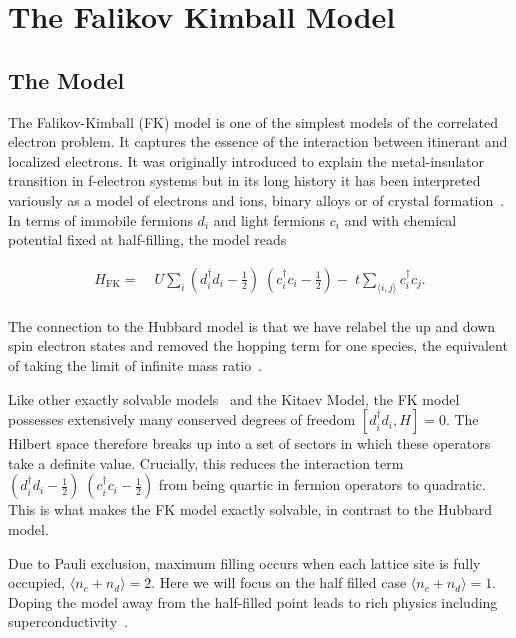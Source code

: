 \hypertarget{the-falikov-kimball-model}{%
\section{The Falikov Kimball Model}\label{the-falikov-kimball-model}}

\hypertarget{the-model}{%
\subsection{The Model}\label{the-model}}

The Falikov-Kimball (FK) model is one of the simplest models of the correlated electron problem. It captures the essence of the interaction between itinerant and localized electrons. It was originally introduced to explain the metal-insulator transition in f-electron systems but in its long history it has been interpreted variously as a model of electrons and ions, binary alloys or of crystal formation~\autocite{hubbardj.ElectronCorrelationsNarrow1963,falicovSimpleModelSemiconductorMetal1969,gruberFalicovKimballModelReview1996,gruberFalicovKimballModel2006}. In terms of immobile fermions \(d_i\) and light fermions \(c_i\) and with chemical potential fixed at half-filling, the model reads

\[\begin{aligned}
H_{\mathrm{FK}} = & \;U \sum_{i} (d^\dagger_{i}d_{i} - \tfrac{1}{2})\;(c^\dagger_{i}c_{i} - \tfrac{1}{2}) -\;t \sum_{\langle i,j\rangle} c^\dagger_{i}c_{j}.\\ 
\end{aligned}\]

The connection to the Hubbard model is that we have relabel the up and down spin electron states and removed the hopping term for one species, the equivalent of taking the limit of infinite mass ratio~\autocite{devriesSimplifiedHubbardModel1993}.

Like other exactly solvable models~\autocite{smithDisorderFreeLocalization2017} and the Kitaev Model, the FK model possesses extensively many conserved degrees of freedom \([d^\dagger_{i}d_{i}, H] = 0\). The Hilbert space therefore breaks up into a set of sectors in which these operators take a definite value. Crucially, this reduces the interaction term \((d^\dagger_{i}d_{i} - \tfrac{1}{2})\;(c^\dagger_{i}c_{i} - \tfrac{1}{2})\) from being quartic in fermion operators to quadratic. This is what makes the FK model exactly solvable, in contrast to the Hubbard model.

Due to Pauli exclusion, maximum filling occurs when each lattice site is fully occupied, \(\langle n_c + n_d \rangle = 2\). Here we will focus on the half filled case \(\langle n_c + n_d \rangle = 1\). Doping the model away from the half-filled point leads to rich physics including superconductivity~\autocite{jedrzejewskiFalicovKimballModels2001}.

